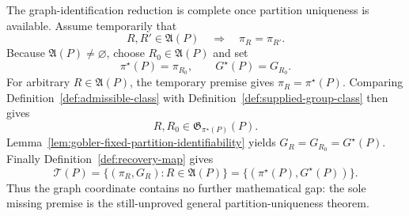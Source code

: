 The graph-identification reduction is complete once partition uniqueness is available.  Assume temporarily that
\[
R,R'\in\mathfrak A(P)\quad\Longrightarrow\quad\pi_R=\pi_{R'}.
\]
Because \(\mathfrak A(P)\neq\varnothing\), choose \(R_0\in\mathfrak A(P)\) and set
\[
\pi^\star(P)=\pi_{R_0},\qquad G^\star(P)=G_{R_0}.
\]
For arbitrary \(R\in\mathfrak A(P)\), the temporary premise gives \(\pi_R=\pi^\star(P)\).  Comparing Definition~\ref{def:admissible-class} with Definition~\ref{def:supplied-group-class} then gives
\[
R,R_0\in\mathfrak G_{\pi^\star(P)}(P).
\]
Lemma~\ref{lem:gobler-fixed-partition-identifiability} yields \(G_R=G_{R_0}=G^\star(P)\).  Finally Definition~\ref{def:recovery-map} gives
\[
\mathcal T(P)
=\{(\pi_R,G_R):R\in\mathfrak A(P)\}
=\{(\pi^\star(P),G^\star(P))\}.
\]
Thus the graph coordinate contains no further mathematical gap: the sole missing premise is the still-unproved general partition-uniqueness theorem.